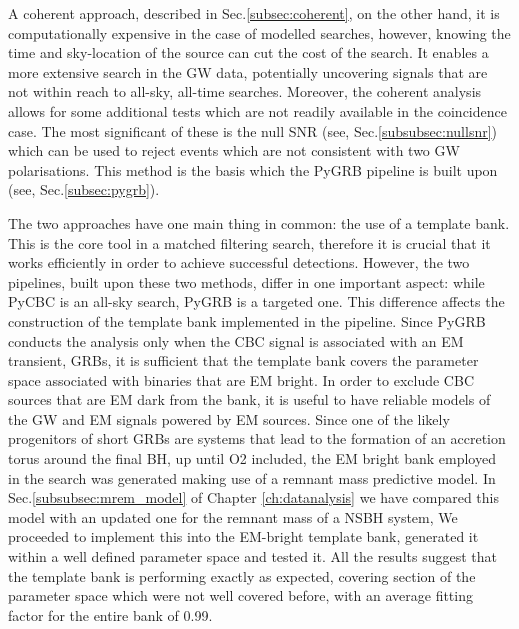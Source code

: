 \documentclass[binding=0.6cm, LaM]{sapthesis}
\begin{document}
        A coherent approach, described in Sec.\ref{subsec:coherent}, on the other hand,
        it is computationally expensive in the case of modelled searches,
        however, knowing the time and sky-location of the source can cut the cost of the search.
        It enables a more extensive search in the GW data, potentially uncovering signals
        that are not within reach to all-sky, all-time searches.
        Moreover, the coherent analysis allows for some additional tests
        which are not readily available in the coincidence case.
        The most significant of these is the null SNR (see, Sec.\ref{subsubsec:nullsnr}) which can be used to reject events which are
        not consistent with two GW polarisations.
        This method is the basis which the {\ttfamily PyGRB} pipeline is built upon (see, Sec.\ref{subsec:pygrb}).

	The two approaches have one main thing in common: the use of a template bank.
	This is the core tool in a matched filtering search,
	therefore it is crucial that it works efficiently in order to achieve successful detections.
	However, the two pipelines, built upon these two methods, differ in one important aspect: 
	while {\ttfamily PyCBC} is an all-sky search, {\ttfamily PyGRB} is a targeted one.
	This difference affects the construction of the template bank implemented in the pipeline.
	Since {\ttfamily PyGRB} conducts the analysis only when the CBC signal is associated with an EM transient, GRBs,
	it is sufficient that the template bank covers the parameter space associated with binaries that are EM bright.
	In order to exclude CBC sources that are EM dark from the bank, 
	it is useful to have reliable models of the GW and EM signals powered by EM sources.
	Since one of the likely progenitors of short GRBs are systems that 
	lead to the formation of an accretion torus around the final BH,
	up until O2 included, the EM bright bank employed in the search 
	was generated making use of a remnant mass predictive model.
 	In Sec.\ref{subsubsec:mrem_model} of Chapter \ref{ch:datanalysis} we have compared this model \cite{50}
        with an updated one \cite{54} for the remnant mass of a NSBH system,
	We proceeded to implement this into the EM-bright template bank,
        generated it within a well defined parameter space and tested it.
        All the results suggest that the template bank is performing exactly as expected,
        covering section of the parameter space which were not well covered before,
        with an average fitting factor for the entire bank of 0.99.
	
\end{document}
